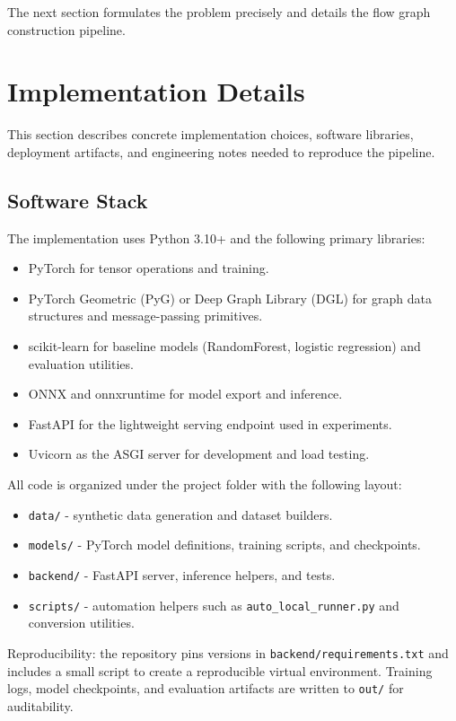 \documentclass[conference]{IEEEtran}
\begin{document}
The next section formulates the problem precisely and details the flow graph construction pipeline.

\section{Implementation Details}

This section describes concrete implementation choices, software libraries, deployment artifacts, and engineering notes needed to reproduce the pipeline.

\subsection{Software Stack}

The implementation uses Python 3.10+ and the following primary libraries:

\begin{itemize}
  \item PyTorch for tensor operations and training.
  \item PyTorch Geometric (PyG) or Deep Graph Library (DGL) for graph data structures and message-passing primitives.
  \item scikit-learn for baseline models (RandomForest, logistic regression) and evaluation utilities.
  \item ONNX and onnxruntime for model export and inference.
  \item FastAPI for the lightweight serving endpoint used in experiments.
  \item Uvicorn as the ASGI server for development and load testing.
\end{itemize}

All code is organized under the project folder with the following layout:

\begin{itemize}
  \item \texttt{data/} - synthetic data generation and dataset builders.
  \item \texttt{models/} - PyTorch model definitions, training scripts, and checkpoints.
  \item \texttt{backend/} - FastAPI server, inference helpers, and tests.
  \item \texttt{scripts/} - automation helpers such as \texttt{auto\_local\_runner.py} and conversion utilities.
\end{itemize}

Reproducibility: the repository pins versions in \texttt{backend/requirements.txt} and includes a small script to create a reproducible virtual environment. Training logs, model checkpoints, and evaluation artifacts are written to \texttt{out/} for auditability.
\end{document}
